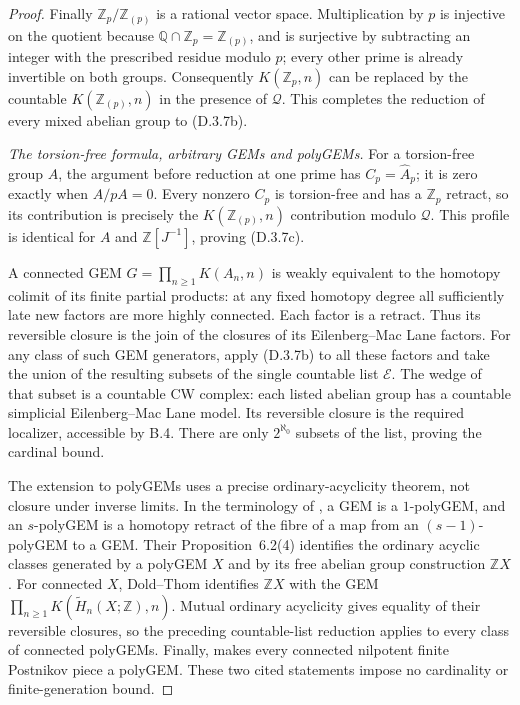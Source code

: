 \begin{proof}
Finally $\mathbb Z_p/\mathbb Z_{(p)}$ is a rational vector space.
Multiplication by $p$ is injective on the quotient because
$\mathbb Q\cap\mathbb Z_p=\mathbb Z_{(p)}$, and is surjective by
subtracting an integer with the prescribed residue modulo $p$;
every other prime is already invertible on both groups.  Consequently
$K(\mathbb Z_p,n)$ can be replaced by the countable
$K(\mathbb Z_{(p)},n)$ in the presence of $\mathcal Q$.
This completes the reduction of every mixed abelian group to
(D.3.7b).

\medskip\noindent
\emph{The torsion-free formula, arbitrary GEMs and polyGEMs.}
For a torsion-free group $A$, the argument before reduction at one
prime has
$C_p=\widehat A_p$; it is zero exactly when $A/pA=0$.
Every nonzero $C_p$ is torsion-free and has a $\mathbb Z_p$
retract, so its contribution is precisely the
$K(\mathbb Z_{(p)},n)$ contribution modulo $\mathcal Q$.
This profile is identical for $A$ and
$\mathbb Z[J^{-1}]$, proving (D.3.7c).

A connected GEM $G=\prod_{n\geq1}K(A_n,n)$ is weakly equivalent
to the homotopy colimit of its finite partial products: at any fixed
homotopy degree all sufficiently late new factors are more highly
connected.  Each factor is a retract.  Thus its reversible closure
is the join of the closures of its Eilenberg--Mac Lane factors.
For any class of such GEM generators, apply (D.3.7b) to all these
factors and take the union of the resulting subsets of the single
countable list $\mathcal E$.  The wedge of that subset is a
countable CW complex: each listed abelian group has a countable
simplicial Eilenberg--Mac Lane model.  Its reversible closure is
the required localizer, accessible by B.4.  There are only
$2^{\aleph_0}$ subsets of the list, proving the cardinal bound.

The extension to polyGEMs uses a precise ordinary-acyclicity theorem,
not closure under inverse limits.  In the terminology of
\citet{FGHCFFS2015}, a GEM is a $1$-polyGEM, and an $s$-polyGEM
is a homotopy retract of the fibre of a map from an
$(s-1)$-polyGEM to a GEM.  Their Proposition~6.2(4) identifies the ordinary
acyclic classes generated by a polyGEM $X$ and by its free abelian
group construction $\mathbb ZX$.  For connected $X$, Dold--Thom
identifies $\mathbb ZX$ with the GEM
$\prod_{n\geq1}K(\widetilde H_n(X;\mathbb Z),n)$.
Mutual ordinary acyclicity gives equality of their reversible
closures, so the preceding countable-list reduction applies to
every class of connected polyGEMs.  Finally,
\citep[Proposition~5.2]{FGHCFFS2015} makes every connected
nilpotent finite Postnikov piece a polyGEM.  These two cited
statements impose no cardinality or finite-generation bound.
\end{proof}

